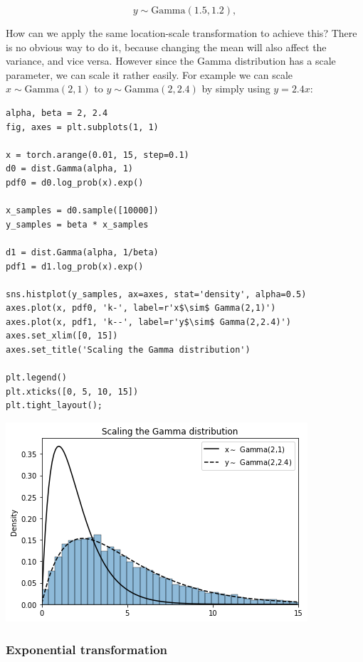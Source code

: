 \documentclass[11pt]{article}
\begin{document}
$$y \sim \text{Gamma} (1.5, 1.2), $$

How can we apply the same location-scale transformation to achieve this? There is no obvious way to do it, because changing the mean will also affect the variance, and vice versa. However since the Gamma distribution has a scale parameter, we can scale it rather easily. For example we can scale \(x \sim \text{Gamma} (2, 1)\) to \(y \sim \text{Gamma} (2, 2.4)\) by simply using \(y = 2.4 x:\)

\begin{verbatim}
alpha, beta = 2, 2.4
fig, axes = plt.subplots(1, 1)

x = torch.arange(0.01, 15, step=0.1)
d0 = dist.Gamma(alpha, 1)
pdf0 = d0.log_prob(x).exp()

x_samples = d0.sample([10000])
y_samples = beta * x_samples

d1 = dist.Gamma(alpha, 1/beta)
pdf1 = d1.log_prob(x).exp()

sns.histplot(y_samples, ax=axes, stat='density', alpha=0.5)
axes.plot(x, pdf0, 'k-', label=r'x$\sim$ Gamma(2,1)')
axes.plot(x, pdf1, 'k--', label=r'y$\sim$ Gamma(2,2.4)')
axes.set_xlim([0, 15])
axes.set_title('Scaling the Gamma distribution')

plt.legend()
plt.xticks([0, 5, 10, 15])
plt.tight_layout();
\end{verbatim}

\begin{center}
\includegraphics[width=.9\linewidth]{./.ob-jupyter/59bd25ca19d90e1a44996d15355d8ece74116224.png}
\end{center}

\subsubsection{Exponential transformation}
\label{sec:orgf10cbde}
\end{document}
